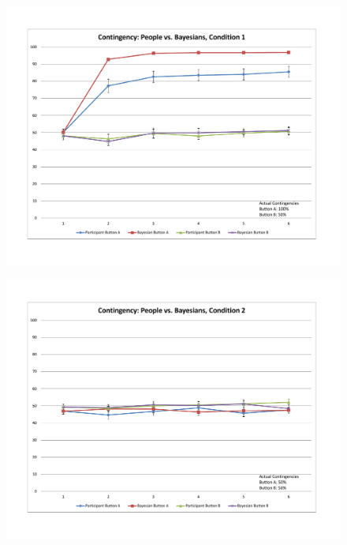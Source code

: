\documentclass[USenglish,letterpaper,12pt,extrafontsizes,oneside,onecolumn,final]{memoir}
\begin{document}
\begin{figure}
\begin{center}
\includegraphics[width=\textwidth]{learning1}
\caption{\textsf{}\label{fig:learning1}}
\end{center}
\end{figure}
 
 
\begin{figure}
\begin{center}
\includegraphics[width=\textwidth]{learning2}
\caption{\textsf{}\label{fig:learning2}}
\end{center}
\end{figure}
  
\end{document}

